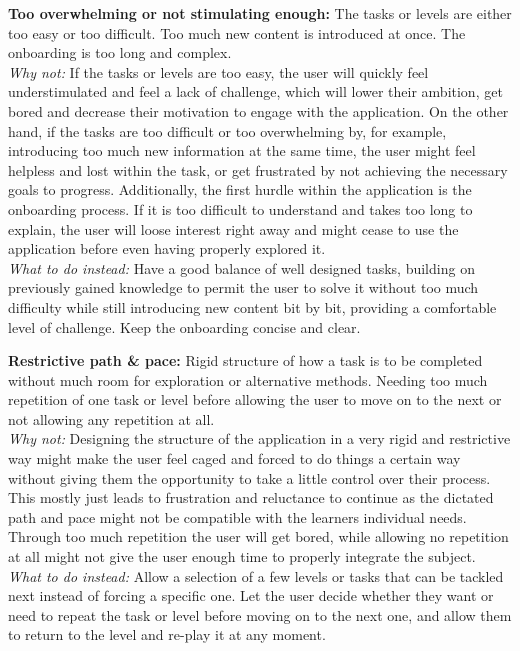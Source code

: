\textbf{Too overwhelming or not stimulating enough:}
The tasks or levels are either too easy or too difficult. Too much new content is introduced at once. The onboarding is too long and complex. \\ \indent
\textit{Why not:} If the tasks or levels are too easy, the user will quickly feel understimulated and feel a lack of challenge, which will lower their ambition, get bored and decrease their motivation to engage with the application. On the other hand, if the tasks are too difficult or too overwhelming by, for example, introducing too much new information at the same time, the user might feel helpless and lost within the task, or get frustrated by not achieving the necessary goals to progress. Additionally, the first hurdle within the application is the onboarding process. If it is too difficult to understand and takes too long to explain, the user will loose interest right away and might cease to use the application before even having properly explored it. \\ \indent
\textit{What to do instead:} Have a good balance of well designed tasks, building on previously gained knowledge to permit the user to solve it without too much difficulty while still introducing new content bit by bit, providing a comfortable level of challenge. Keep the onboarding concise and clear.

\textbf{Restrictive path \& pace:}
Rigid structure of how a task is to be completed without much room for exploration or alternative methods. Needing too much repetition of one task or level before allowing the user to move on to the next or not allowing any repetition at all. \\ \indent
\textit{Why not:} Designing the structure of the application in a very rigid and restrictive way might make the user feel caged and forced to do things a certain way without giving them the opportunity to take a little control over their process. This mostly just leads to frustration and reluctance to continue as the dictated path and pace might not be compatible with the learners individual needs. Through too much repetition the user will get bored, while allowing no repetition at all might not give the user enough time to properly integrate the subject. \\ \indent
\textit{What to do instead:} Allow a selection of a few levels or tasks that can be tackled next instead of forcing a specific one. Let the user decide whether they want or need to repeat the task or level before moving on to the next one, and allow them to return to the level and re-play it at any moment.

